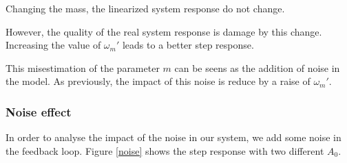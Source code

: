 Changing the mass, the linearized system response do not change.

However, the quality of the real system response is damage by this change. Increasing the value of $\omega_m'$ leads to a better step response.

This misestimation of the parameter $m$ can be seens as the addition of noise in the model. As previously, the impact of this noise is reduce by a raise of $\omega_m'$.

\subsubsection*{Noise effect}

In order to analyse the impact of the noise in our system, we add some noise in the feedback loop. Figure \ref{noise} shows the step response with two different $A_0$.

